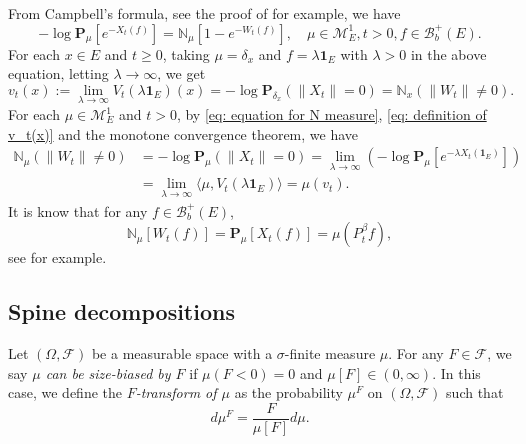 \documentclass[12pt, a4paper]{amsart}
\theoremstyle{definition}
\numberwithin{equation}{section}
\begin{document}
	From  Campbell's formula, see  the proof of \cite[Theorem 2.7]{Kyprianou2014Fluctuations} for example, we have
\begin{equation} \label{eq: equation for N measure}
	- \log \mathbf P_\mu [e^{-X_t(f)}]
	= \mathbb N_\mu[ 1-e^{- W_t(f)}],
	\quad \mu \in \mathcal M_E^1, t>0, f\in \mathscr B_b^+(E).
\end{equation}
	For each $x\in E$ and $t\geq 0$, taking $\mu = \delta_x$ and $f = \lambda \mathbf 1_E$ with $\lambda > 0$ in the above equation, letting $\lambda \to \infty$, we get
\begin{equation} \label{eq: definition of v_t(x)}
	v_t(x)
	:= \lim_{\lambda\to \infty} V_t(\lambda\mathbf 1_E)(x)
	= -\log \mathbf P_{\delta_x} (\|X_t\|=0)
	= \mathbb N_x(\|W_t\|\neq 0).
\end{equation}
	For each $\mu \in \mathcal M_E^1$ and $t > 0$, by \eqref{eq: equation for N measure}, \eqref{eq: definition of v_t(x)} and the monotone convergence theorem, we have
\begin{equation} \label{eq: equation for mu v-t} \begin{split}
    \mathbb N_\mu(\|W_t\|\neq 0)
	&= -\log \mathbf P_{\mu} (\|X_t\|=0)
	= \lim_{\lambda \to \infty} (- \log \mathbf P_\mu [e^{-\lambda X_t(\mathbf 1_E)}])
	\\&= \lim_{\lambda \to \infty} \langle \mu, V_t(\lambda \mathbf 1_E)\rangle
	= \mu(v_t).
\end{split} \end{equation}
	It is know that for any $f\in\mathscr B_b^+(E)$,
\begin{equation}\label{eq: mean of kuz measure}
    \mathbb N_{\mu}[W_t(f)]
    =\mathbf P_{\mu}[X_t(f)]=\mu(P^\beta_tf),
\end{equation}
    see \cite[Lemma 3.3]{RenSongSun2017Spine} for example.


\subsection{Spine decompositions}
\label{sec: Spine decompositions}
	Let $(\Omega, \mathscr F)$ be a measurable space with a $\sigma$-finite measure $\mu$.
	For any $F\in \mathscr F$, we say \emph{$\mu$ can be size-biased by $F$} if $\mu(F< 0) = 0$ and $\mu [F] \in (0,\infty)$.
	In this case, we define the \emph{$F$-transform of $\mu$} as the probability $\mu^F$ on $(\Omega, \mathscr F)$ such that
\begin{equation}	
	d\mu^F
	= \frac{F}{\mu[F]}d \mu.
\end{equation}
\end{document}
